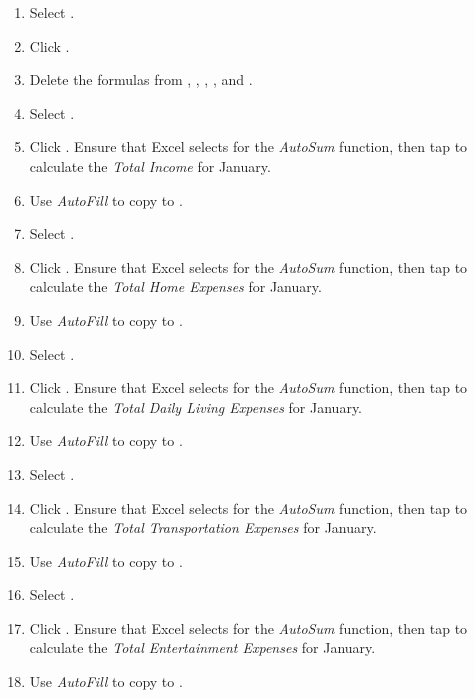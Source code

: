 \begin{enumbox}
\begin{enumerate}
		\item Select .
		\item Click . 
		\item Delete the formulas from , , , , and .
	
		\item Select .
		\item Click . Ensure that Excel selects  for the \textit{AutoSum} function, then tap  to calculate the \textit{Total Income} for January.
		\item Use \textit{AutoFill} to copy  to .
	
		\item Select .
		\item Click . Ensure that Excel selects  for the \textit{AutoSum} function, then tap  to calculate the \textit{Total Home Expenses} for January.
		\item Use \textit{AutoFill} to copy  to .
		
		\item Select .
		\item Click . Ensure that Excel selects  for the \textit{AutoSum} function, then tap  to calculate the \textit{Total Daily Living Expenses} for January.
		\item Use \textit{AutoFill} to copy  to .
		
		\item Select .
		\item Click . Ensure that Excel selects  for the \textit{AutoSum} function, then tap  to calculate the \textit{Total Transportation Expenses} for January.
		\item Use \textit{AutoFill} to copy  to .
	
		\item Select .
		\item Click . Ensure that Excel selects  for the \textit{AutoSum} function, then tap  to calculate the \textit{Total Entertainment Expenses} for January.
		\item Use \textit{AutoFill} to copy  to .
	

\end{enumerate}
\end{enumbox}
